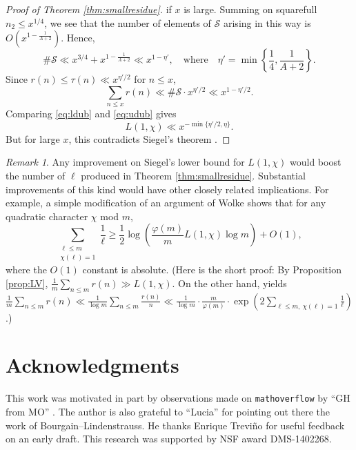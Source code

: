 \documentclass{scrartcl}
\theoremstyle{plain}
\theoremstyle{remark}
\newtheorem*{remark}{Remark}
\renewcommand{\phi}{\varphi}
\newcommand{\Ss}{\mathcal{S}}
\newcommand{\1}{\mathbf{1}}
\begin{document}
\begin{proof}[Proof of Theorem \ref{thm:smallresidue}]
if $x$ is large. Summing on squarefull $n_2 \le x^{1/4}$, we see that the number of elements of $\Ss$ arising in this way is $O(x^{1-\frac{1}{A+2}})$. Hence,
\[ \#\Ss \ll x^{3/4} + x^{1-\frac{1}{A+2}} \ll x^{1-\eta'}, \quad\text{where}\quad \eta'=\min\left\{\frac14,\frac{1}{A+2}\right\}. \]
Since $r(n) \le \tau(n) \ll x^{\eta'/2}$ for $n \le x$,
\begin{equation}\label{eq:udub} \sum_{n\le x} r(n) \ll \#\Ss\cdot x^{\eta'/2} \ll x^{1-\eta'/2}. \end{equation}
Comparing \eqref{eq:ldub} and \eqref{eq:udub} gives
\[ L(1,\chi) \ll x^{-\min\{\eta'/2,\eta\}}. \]
But for large $x$, this contradicts Siegel's theorem \cite[Theorem 11.14, p. 372]{MV07}.
\end{proof}

\begin{remark} Any improvement on Siegel's lower bound for $L(1,\chi)$ would boost the number of $\ell$ produced in Theorem \ref{thm:smallresidue}. Substantial improvements of this kind would have other closely related implications. For example, a simple modification of an argument of Wolke \cite{wolke69} shows that for any quadratic character $\chi$ mod $m$,
\[ \sum_{\substack{\ell \le m \\ \chi(\ell)= 1}}\frac{1}{\ell} \ge \frac{1}{2} \log\left(\frac{\varphi(m)}{m} L(1,\chi) \log{m}\right) + O(1), \]
where the $O(1)$ constant is absolute. {(Here is the short proof: By Proposition \ref{prop:LV}, $\frac{1}{m}\sum_{n \le m}r(n) \gg L(1,\chi)$. On the other hand, \cite[Theorem 5, p. 308]{tenenbaum95} yields $\frac{1}{m}\sum_{n \le m} r(n) \ll \frac{1}{\log{m}} \sum_{n \le m} \frac{r(n)}{n} \ll \frac{1}{\log{m}} \cdot \frac{m}{\phi(m)} \cdot \exp\left(2 \sum_{\ell \le m,~\chi(\ell)=1}\frac{1}{\ell}\right)$.)}
\end{remark}

\section*{Acknowledgments}  This work was motivated in part by observations made on \texttt{mathoverflow} by ``GH from MO'' \cite{52393}. The author is also grateful to ``Lucia'' for pointing out there the work of Bourgain--Lindenstrauss. He thanks Enrique Trevi\~no for useful feedback on an early draft. This research was supported by NSF award DMS-1402268.
\end{document}
